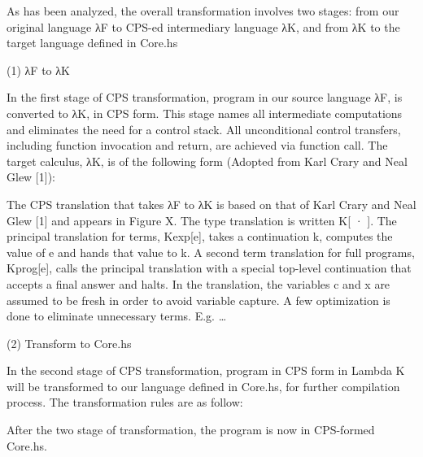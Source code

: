 As has been analyzed, the overall transformation involves two stages: from our original language λF to CPS-ed intermediary language λK, and from λK to the target language defined in Core.hs

(1) λF to λK

In the first stage of CPS transformation, program in our source language λF, is converted to λK, in CPS form. This stage names all intermediate computations and eliminates the need for a control stack. All unconditional control transfers, including function invocation and return, are achieved via function call. The target calculus, λK, is of the following form (Adopted from Karl Crary and Neal Glew [1]):


The CPS translation that takes λF to λK is based on that of Karl Crary and Neal Glew [1] and appears in Figure X. The type translation is written K[ · ]. The principal translation for terms, Kexp[e], takes a continuation k, computes the value of e and hands that value to k. A second term translation for full programs, Kprog[e], calls the principal translation with a special top-level continuation that accepts a final answer and halts. In the translation, the variables c and x are assumed to be fresh in order to avoid variable capture. 
A few optimization is done to eliminate unnecessary terms. E.g. …


(2) Transform to Core.hs

In the second stage of CPS transformation, program in CPS form in Lambda K will be transformed to our language defined in Core.hs, for further compilation process. The transformation rules are as follow:

After the two stage of transformation, the program is now in CPS-formed Core.hs.

